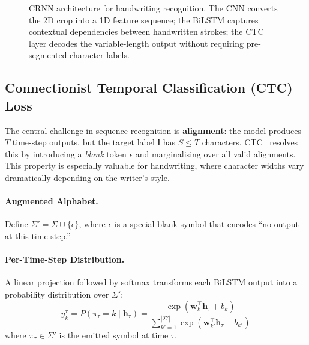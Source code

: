 \documentclass[11pt, a4paper]{article}
\begin{document}
\begin{figure}[H]
  \centering
  \caption{CRNN architecture for handwriting recognition. The CNN converts the 2D crop into a 1D feature sequence; the BiLSTM captures contextual dependencies between handwritten strokes; the CTC layer decodes the variable-length output without requiring pre-segmented character labels.}
  \label{fig:crnn_arch}
\end{figure}


\subsection{Connectionist Temporal Classification (CTC) Loss}\label{sec:ctc}

The central challenge in sequence recognition is \textbf{alignment}: the model produces $T$ time-step outputs, but the target label $\mathbf{l}$ has $S \leq T$ characters. CTC~\cite{graves2006ctc} resolves this by introducing a \emph{blank} token $\epsilon$ and marginalising over all valid alignments. This property is especially valuable for handwriting, where character widths vary dramatically depending on the writer's style.

\paragraph{Augmented Alphabet.}
Define $\Sigma' = \Sigma \cup \{\epsilon\}$, where $\epsilon$ is a special blank symbol that encodes ``no output at this time-step.''

\paragraph{Per-Time-Step Distribution.}
A linear projection followed by softmax transforms each BiLSTM output into a probability distribution over $\Sigma'$:
\begin{equation}\label{eq:softmax}
  y_k^\tau = P(\pi_\tau = k \mid \mathbf{h}_\tau) = \frac{\exp(\mathbf{w}_k^\top \mathbf{h}_\tau + b_k)}{\sum_{k'=1}^{|\Sigma'|} \exp(\mathbf{w}_{k'}^\top \mathbf{h}_\tau + b_{k'})}
\end{equation}
where $\pi_\tau \in \Sigma'$ is the emitted symbol at time $\tau$.
\end{document}
